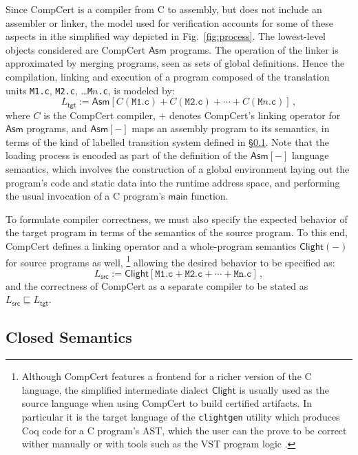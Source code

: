 \documentclass[sigplan,10pt,review,anonymous]{acmart}
\newcommand{\kw}[1]{\ensuremath{ \mathsf{#1} }}
\begin{document}
Since CompCert is a compiler from C to assembly,
but does not include an assembler or linker,
the model used for verification accounts for
some of these aspects in ithe simplified way
depicted in Fig.~\ref{fig:process}.
The lowest-level objects considered
are CompCert \kw{Asm} programs.
The operation of the linker is approximated by
merging programs, seen as sets of global definitions.
Hence the compilation, linking and execution
of a program composed of the translation units
\texttt{M1.c}, \texttt{M2.c}, \ldots \texttt{M$n$.c},
is modeled by:
\[
    L_\kw{tgt} :=
    \kw{Asm}[C(\texttt{M1.c}) +
             C(\texttt{M2.c}) +
             \cdots +
             C(\texttt{M$n$.c})] \,,
\]
where $C$ is the CompCert compiler,
$+$ denotes CompCert's linking operator for \kw{Asm} programs, and
$\kw{Asm[-]}$ maps an assembly program to its semantics,
in terms of the kind of labelled transition system
defined in \S\ref{sec:sem:closed}.
Note that the loading process is encoded
as part of the definition of the $\kw{Asm}[-]$ language semantics,
which involves the construction of a global environment
laying out the program's code and static data
into the runtime address space,
and performing the usual invocation of a C program's
\kw{main} function.

To formulate compiler correctness,
we must also specify the expected behavior of the target program
in terms of the semantics of the source program.
To this end,
CompCert defines a linking operator
and a whole-program semantics $\kw{Clight}(-)$
for source programs as well,%
\footnote{
  Although CompCert features a frontend for a richer version
  of the C language,
  the simplified intermediate dialect \kw{Clight}
  is usually used as the source language
  when using CompCert to build certified artifacts.
  In particular it is the target language of the
  \texttt{clightgen} utility which
  produces Coq code for a C program's AST,
  which the user can the prove to be correct
  wither manually or with tools such as the VST program logic
  \cite{vst}.
}
allowing the desired behavior to be specified as:
\[
    L_\kw{src} :=
    \kw{Clight}[\texttt{M1.c} + \texttt{M2.c} + \cdots + \texttt{Mn.c}] \,,
\]
and the correctness of CompCert
as a separate compiler
to be stated as $L_\kw{src} \sqsubseteq L_\kw{tgt}$.


\subsection{Closed Semantics} \label{sec:sem:closed} %
\end{document}
